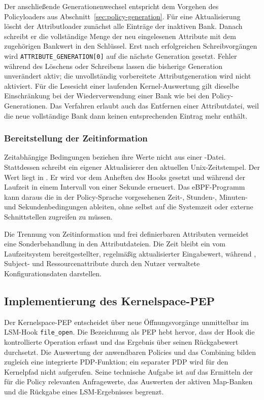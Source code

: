 Der anschließende Generationenwechsel entspricht dem Vorgehen des Policyloaders aus Abschnitt~\ref{sec:policy-generation}. Für eine Aktualisierung löscht der Attributloader zunächst alle Einträge der inaktiven Bank. Danach schreibt er die vollständige Menge der neu eingelesenen Attribute mit dem zugehörigen Bankwert in den Schlüssel. Erst nach erfolgreichen Schreibvorgängen wird \texttt{ATTRIBUTE\_GENERATION[0]} auf die nächste Generation gesetzt. Fehler während des Löschens oder Schreibens lassen die bisherige Generation unverändert aktiv; die unvollständig vorbereitete Attributgeneration wird nicht aktiviert. Für die Lesesicht einer laufenden Kernel-Auswertung gilt dieselbe Einschränkung bei der Wiederverwendung einer Bank wie bei den Policy-Generationen. Das Verfahren erlaubt auch das Entfernen einer Attributdatei, weil die neue vollständige Bank dann keinen entsprechenden Eintrag mehr enthält.

\subsubsection{Bereitstellung der Zeitinformation}
Zeitabhängige Bedingungen beziehen ihre Werte nicht aus einer -Datei. Stattdessen schreibt ein eigener Aktualisierer den aktuellen Unix-Zeitstempel. Der Wert liegt in . Er wird vor dem Anheften des Hooks gesetzt und während der Laufzeit in einem Intervall von einer Sekunde erneuert. Das eBPF-Programm kann daraus die in der Policy-Sprache vorgesehenen Zeit-, Stunden-, Minuten- und Sekundenbedingungen ableiten, ohne selbst auf die Systemzeit oder externe Schnittstellen zugreifen zu müssen.

Die Trennung von Zeitinformation und frei definierbaren Attributen vermeidet eine Sonderbehandlung in den Attributdateien. Die Zeit bleibt ein vom Laufzeitsystem bereitgestellter, regelmäßig aktualisierter Eingabewert, während , Subject- und Ressourcenattribute durch den Nutzer verwaltete Konfigurationsdaten darstellen.

\subsection{Implementierung des Kernelspace-PEP}\label{sec:kernelspace-pep}
Der Kernelspace-PEP entscheidet über neue Öffnungsvorgänge unmittelbar im LSM-Hook \texttt{file\_open}.
Die Bezeichnung als PEP hebt hervor, dass der Hook die kontrollierte Operation erfasst und das Ergebnis über seinen Rückgabewert durchsetzt.
Die Auswertung der anwendbaren Policies und das Combining bilden zugleich eine integrierte PDP-Funktion; ein separater PDP wird für den Kernelpfad nicht aufgerufen.
Seine technische Aufgabe ist auf das Ermitteln der für die Policy relevanten Anfragewerte, das Auswerten der aktiven Map-Banken und die Rückgabe eines LSM-Ergebnisses begrenzt.

